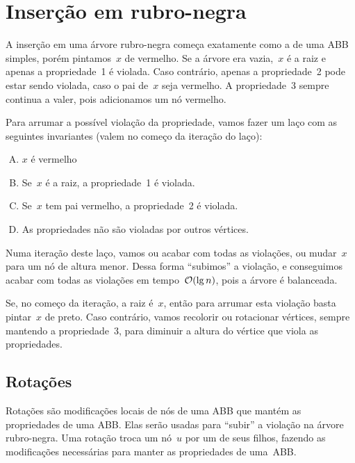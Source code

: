 \documentclass[../../main.tex]{subfiles}
\begin{document}
\section{Inserção em rubro-negra}

A inserção em uma árvore rubro-negra começa exatamente como a de uma ABB simples, porém pintamos~$x$ de vermelho.
Se a árvore era vazia,~$x$ é a raiz e apenas a propriedade~1 é violada. Caso contrário, apenas a propriedade~2 pode estar sendo violada, caso o pai de~$x$ seja vermelho. A propriedade~3 sempre continua a valer, pois adicionamos um nó vermelho.

Para arrumar a possível violação da propriedade, vamos fazer um laço com as seguintes invariantes (valem no começo da iteração do laço):
\begin{enumerate}[(A)]
\item $x$ é vermelho
\item Se~$x$ é a raiz, a propriedade~1 é violada.
\item Se~$x$ tem pai vermelho, a propriedade~2 é violada.
\item As propriedades não são violadas por outros vértices.
\end{enumerate}

Numa iteração deste laço, vamos ou acabar com todas as violações, ou mudar~$x$ para um nó de altura menor. Dessa forma ``subimos'' a violação, e conseguimos acabar com todas as violações em tempo~$\mathcal{O}(\lg n)$, pois a árvore é balanceada.

Se, no começo da iteração, a raiz é~$x$, então para arrumar esta violação basta pintar~$x$ de preto. Caso contrário, vamos recolorir ou rotacionar vértices, sempre mantendo a propriedade~3, para diminuir a altura do vértice que viola as propriedades.

\subsection{Rotações}

Rotações são modificações locais de nós de uma ABB que mantém as propriedades de uma ABB. Elas serão usadas para ``subir'' a violação na árvore rubro-negra. Uma rotação troca um nó~$u$ por um de seus filhos, fazendo as modificações necessárias para manter as propriedades de uma~ABB.
\end{document}
